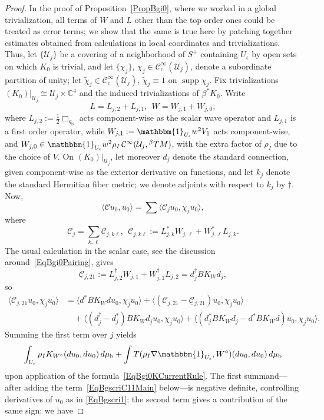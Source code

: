 \documentclass[reqno,11pt,letterpaper]{amsart}
\numberwithin{equation}{section}
\numberwithin{figure}{section}
\theoremstyle{definition}
\theoremstyle{remark}
\newcommand{\mc}{\mathcal}
\newcommand{\cC}{\mc C}
\newcommand{\cU}{\mc U}
\newcommand{\C}{\mathbb{C}}
\newcommand{\one}{\mathbbm{1}}
\newcommand{\supp}{\operatorname{supp}}
\newcommand{\eps}{\epsilon}
\newcommand{\la}{\langle}
\newcommand{\ra}{\rangle}
\newcommand{\ul}[1]{\underline{#1}{}}
\newcommand{\wt}{\widetilde}
\newcommand{\bop}{{\mathrm{b}}}
\newcommand{\cp}{{\mathrm{c}}}
\newcommand{\Tbeta}{{}^{\beta}T}
\newcommand{\half}{\tfrac{1}{2}}
\newcommand{\CI}{\cC^\infty}
\newcommand{\CIc}{\cC^\infty_\cp}
\begin{document}
\begin{proof}
  In the proof of Proposition~\ref{PropBgi0}, where we worked in a global trivialization, all terms of $W$ and $L$ other than the top order ones could be treated as error terms; we show that the same is true here by patching together estimates obtained from calculations in local coordinates and trivializations. Thus, let $\{\cU_j\}$ be a covering of a neighborhood of $S^+$ containing $U_\eps$ by open sets on which $K_0$ is trivial, and let $\{\chi_j\}$, $\chi_j\in\CIc(\cU_j)$, denote a subordinate partition of unity; let $\wt\chi_j\in\CIc(\cU_j)$, $\wt\chi_j\equiv 1$ on $\supp\chi_j$. Fix trivializations $(K_0)|_{\cU_j}\cong\cU_j\times\C^4$ and the induced trivializations of $\beta^*K_0$. Write
  \[
    L=L_{j,2} + L_{j,1},\ \ 
    W=W_{j,1} + W_{j,0},
  \]
  where $L_{j,2}:=\half\Box_{g_\bop}$ acts component-wise as the scalar wave operator and $L_{j,1}$ is a first order operator, while $W_{j,1}:=\one_{U_\eps}w^2 V_1$ acts component-wise, and $W_{j,0}\in\one_{U_\eps}w^2\rho_I\,\CI(\cU_j,\Tbeta M)$, with the extra factor of $\rho_I$ due to the choice of $V$. On $(K_0)|_{\cU_j}$, let moreover $d_j$ denote the standard connection, given component-wise as the exterior derivative on functions, and let $k_j$ denote the standard Hermitian fiber metric; we denote adjoints with respect to $k_j$ by $\dag$. Now,
  \begin{equation}
  \label{EqBgscriPairingLoc}
    \la\cC u_0,u_0\ra=\sum\la\cC_j u_0,\chi_j u_0\ra,
  \end{equation}
  where
  \[
    \cC_j = \sum_{k,\ell} \cC_{j,k\ell},\ \ 
    \cC_{j,k\ell} := L_{j,k}^*W_{j,\ell} + W_{j,\ell}^*L_{j,k}.
  \]
  The usual calculation in the scalar case, see the discussion around~\eqref{EqBgi0Pairing}, gives
  \[
    \ul\cC_{j,2 1}:=L_{j,2}^\dag W_{j,1}+W_{j,1}^\dag L_{j,2} = d_j^\dag B K_W d_j,
  \]
  so
  \begin{align}
  \label{EqBgscriC21}
    \la \cC_{j,2 1}u_0,\chi_j u_0\ra &= \la d^* B K_W d u_0, \chi_j u_0\ra + \la (\cC_{j,2 1}-\ul\cC_{j,2 1})u_0,\chi_j u_0\ra \\
      &\quad + \la(d_j^\dag-d_j^*)B K_W d_j u_0,\chi_j u_0\ra + \la(d_j^* B K_W d_j-d^* B K_W d)u_0,\chi_j u_0\ra.\nonumber
  \end{align}
  Summing the first term over $j$ yields
  \begin{equation}
  \label{EqBgscriC21Main}
    \int_{U_\eps} \rho_I K_{W^\circ}(d u_0,d u_0)\,d\mu_\bop + \int T(\rho_I\nabla\one_{U_\eps},W^\circ)(d u_0,d u_0)\,d\mu_\bop
  \end{equation}
  upon application of the formula~\eqref{EqBgi0KCurrentRule}. The first summand---after adding the term~\eqref{EqBgscriC11Main} below---is negative definite, controlling derivatives of $u_0$ as in \eqref{EqBgscri1}; the second term gives a contribution of the same sign: we have

\end{proof}
\end{document}
